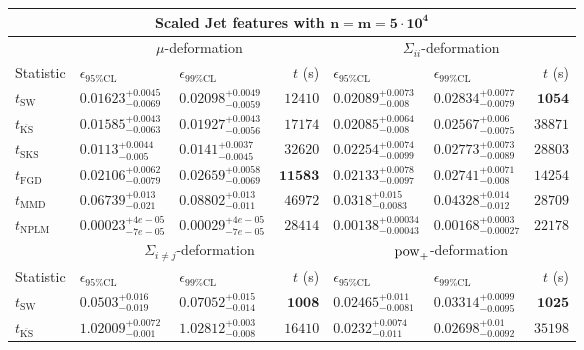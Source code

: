 \begin{tabular}{l|llr|llr}
	\toprule
	\multicolumn{7}{c}{{\bf Scaled Jet features with $\mathbf{n=m=5\cdot 10^{4}}$}} \\
	\toprule
	\multicolumn{1}{c}{} & \multicolumn{3}{c}{$\mu$-deformation} & \multicolumn{3}{c}{$\Sigma_{ii}$-deformation} \\
	Statistic & $\epsilon_{95\%\mathrm{CL}}$ & $\epsilon_{99\%\mathrm    {CL}}$ & $t$ (s) & $\epsilon_{95\%\mathrm{CL}}$ & $\epsilon_{99\%\mathrm{CL}}$ & $t$ (s) \\
	\midrule
	$t_{\mathrm{SW}}$ & $0.01623_{-0.0069}^{+0.0045}$ & $0.02098_{-0.0059}^{+0.0049}$ & $12410$ & $0.02089_{-0.008}^{+0.0073}$ & $0.02834_{-0.0079}^{+0.0077}$ & ${\mathbf{1054}}$ \\
	$t_{\overline{\mathrm{KS}}}$ & $0.01585_{-0.0063}^{+0.0043}$ & $0.01927_{-0.0056}^{+0.0043}$ & $17174$ & ${\mathbf{0.02085_{-0.008}^{+0.0064}}}$ & ${\mathbf{0.02567_{-0.0075}^{+0.006}}}$ & $38871$ \\
	$t_{\mathrm{SKS}}$ & ${\mathbf{0.0113_{-0.005}^{+0.0044}}}$ & ${\mathbf{0.0141_{-0.0045}^{+0.0037}}}$ & $32620$ & $0.02254_{-0.0099}^{+0.0074}$ & $0.02773_{-0.0089}^{+0.0073}$ & $28803$ \\
	$t_{\mathrm{FGD}}$ & $0.02106_{-0.0079}^{+0.0062}$ & $0.02659_{-0.0069}^{+0.0058}$ & ${\mathbf{11583}}$ & $0.02133_{-0.0097}^{+0.0078}$ & $0.02741_{-0.008}^{+0.0071}$ & $14254$ \\
	$t_{\mathrm{MMD}}$ & $0.06739_{-0.021}^{+0.013}$ & $0.08802_{-0.011}^{+0.013}$ & $46972$ & $0.0318_{-0.0083}^{+0.015}$ & $0.04328_{-0.012}^{+0.014}$ & $28709$ \\
\rowcolor{red!35}	$t_{\mathrm{NPLM}}$ & $0.00023_{-7e-05}^{+4e-05}$ & $0.00029_{-7e-05}^{+4e-05}$ & $28414$ & $0.00138_{-0.00043}^{+0.00034}$ & $0.00168_{-0.00027}^{+0.0003}$ & $22178$ \\
	\toprule
	\multicolumn{1}{c}{} & \multicolumn{3}{c}{$\Sigma_{i\neq j}$-deformation} & \multicolumn{3}{c}{$\rm{pow}_{+}$-deformation} \\
Statistic & $\epsilon_{95\%\mathrm{CL}}$ & $\epsilon_{99\%\mathrm{CL}}$ & $t$ (s) & $\epsilon_{95\%\mathrm{CL}}$ & $\epsilon_{99\%\mathrm{CL}}$ & $t$ (s) \\
	\midrule
	$t_{\mathrm{SW}}$ & $0.0503_{-0.019}^{+0.016}$ & $0.07052_{-0.014}^{+0.015}$ & ${\mathbf{1008}}$ & $0.02465_{-0.0081}^{+0.011}$ & $0.03314_{-0.0095}^{+0.0099}$ & ${\mathbf{1025}}$ \\
	$t_{\overline{\mathrm{KS}}}$ & $1.02009_{-0.001}^{+0.0072}$ & $1.02812_{-0.008}^{+0.003}$ & $16410$ & $0.0232_{-0.011}^{+0.0074}$ & $0.02698_{-0.0092}^{+0.01}$ & $35198$ \\

\end{tabular}
